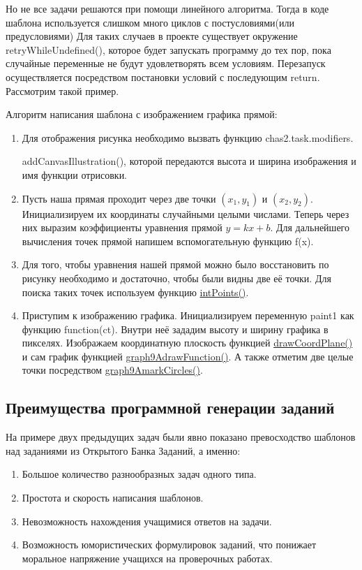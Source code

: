 Но не все задачи решаются при помощи линейного алгоритма. Тогда в коде шаблона
используется слишком много циклов с постусловиями(или предусловиями)
Для таких случаев в проекте существует окружение retryWhileUndefined(), которое
будет запускать программу до тех пор, пока случайные переменные не будут удовлетворять всем условиям.
Перезапуск осуществляется посредством постановки условий с последующим return.
Рассмотрим такой пример.

Алгоритм написания шаблона с изображением графика прямой:
\begin{enumerate}
    \item Для отображения рисунка необходимо вызвать функцию chas2.task.modifiers.

          addCanvasIllustration(), которой передаются высота и ширина изображения и имя функции отрисовки.
          
    \item Пусть наша прямая проходит через две точки $(x_1,y_1)$ и $(x_2,y_2)$. Инициализируем их координаты случайными целыми числами. Теперь через них выразим коэффициенты уравнения прямой $y=kx+b$.
          Для дальнейшего вычисления точек прямой напишем вспомогательную функцию f(x).
          
    \item Для того, чтобы уравнения нашей прямой можно было восстановить по рисунку необходимо и достаточно,
          чтобы были видны две её точки. Для поиска таких точек используем функцию \hyperlink{intPoints}{intPoints()}.
          
    \item Приступим к изображению графика. Инициализируем переменную paint1 как функцию function(ct). Внутри неё зададим высоту и ширину графика в пикселях.
          Изображаем координатную плоскость функцией \hyperlink{drawCoordPlane}{drawCoordPlane()} и сам график функцией
          \hyperlink{graph9AdrawFunction}{graph9AdrawFunction()}. А также отметим две целые точки посредством \hyperlink{graph9AmarkCircles}{graph9AmarkCircles()}.
          \vspace{\baselineskip}

          
\end{enumerate}
\subsection{Преимущества программной генерации заданий}
На примере двух предыдущих задач были явно показано превосходство шаблонов над заданиями из Открытого Банка Заданий, а именно:
\begin{enumerate}
    \item Большое количество разнообразных задач одного типа.
    \item Простота и скорость написания шаблонов.
    \item Невозможность нахождения учащимися ответов на задачи.
    \item Возможность юмористических формулировок заданий, что понижает моральное напряжение учащихся на проверочных работах.%
\end{enumerate}

